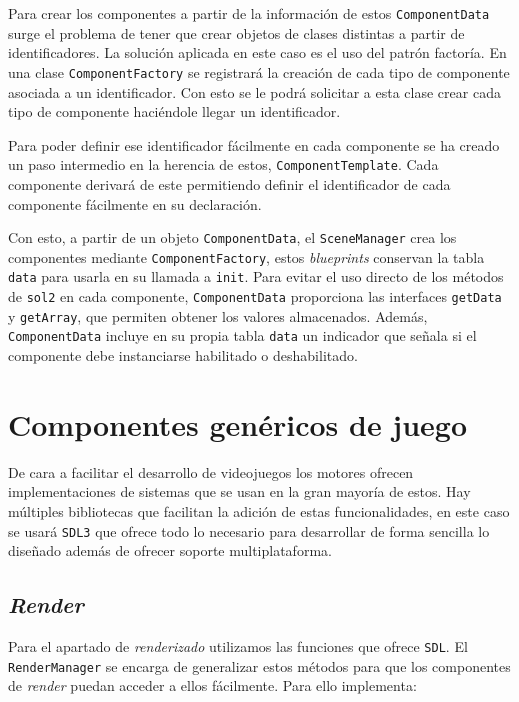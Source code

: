 \medskip

Para crear los componentes a partir de la información de estos \texttt{ComponentData} surge el problema de tener que crear objetos de clases distintas a partir de identificadores. La solución aplicada en este caso es el uso del patrón factoría. En una clase \texttt{ComponentFactory} se registrará la creación de cada tipo de componente asociada a un identificador. Con esto se le podrá solicitar a esta clase crear cada tipo de componente haciéndole llegar un identificador. 

\smallskip

Para poder definir ese identificador fácilmente en cada componente se ha creado un paso intermedio en la herencia de estos, \texttt{ComponentTemplate}. Cada componente derivará de este permitiendo definir el identificador de cada componente fácilmente en su declaración.

\smallskip

Con esto, a partir de un objeto \texttt{ComponentData}, el \texttt{SceneManager} crea los componentes mediante \texttt{ComponentFactory}, estos \textit{blueprints} conservan la tabla \texttt{data} para usarla en su llamada a \texttt{init}. Para evitar el uso directo de los métodos de \texttt{sol2} en cada componente, \texttt{ComponentData} proporciona las interfaces \texttt{getData} y \texttt{getArray}, que permiten obtener los valores almacenados. Además, \texttt{ComponentData} incluye en su propia tabla \texttt{data} un indicador que señala si el componente debe instanciarse habilitado o deshabilitado.

\section{Componentes genéricos de juego}
De cara a facilitar el desarrollo de videojuegos los motores ofrecen implementaciones de sistemas que se usan en la gran mayoría de estos. Hay múltiples bibliotecas que facilitan la adición de estas funcionalidades, en este caso se usará \texttt{SDL3} que ofrece todo lo necesario para desarrollar de forma sencilla lo diseñado además de ofrecer soporte multiplataforma.

\subsection{\textit{Render}}
Para el apartado de \textit{renderizado} utilizamos las funciones que ofrece \texttt{SDL}. El \texttt{RenderManager} se encarga de generalizar estos métodos para que los componentes de \textit{render} puedan acceder a ellos fácilmente. Para ello implementa: 


